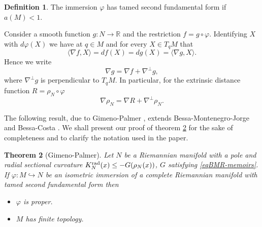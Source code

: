 \documentclass[a4paper]{amsart}
\newtheorem{theorem}{Theorem}[section]
\theoremstyle{definition}
\newtheorem{definition}[theorem]{Definition}
\numberwithin{equation}{section}
\providecommand{\rad}{\mathop{\rm rad}\nolimits}
\begin{document}
\begin{definition}
The immersion $\varphi$ has tamed second fundamental
form if $a(M)< 1$.
\end{definition}

Consider a smooth function $g:N\to {\mathbb{R}}$ and the restriction $f=g\circ \varphi$. Identifying $X$ with $d\varphi(X)$ we have at $q\in M$ and for every $X\in T_qM$ that
\begin{equation}
\langle \nabla f,X\rangle=df(X)=dg(X)=\langle \nabla g,X\rangle.
\end{equation}
Hence we write
\begin{equation}
\nabla g=\nabla f+\nabla^{\perp}g,
\end{equation}
where $\nabla^{\perp}g$ is perpendicular to $T_qM$. In particular, for the extrinsic distance function $R=\rho_N\circ \varphi$
\begin{equation}
\nabla \rho_N=\nabla R+\nabla^\perp \rho_N.
\end{equation}

The following result, due to Gimeno-Palmer \cite{GPGap}, extends Bessa-Montenegro-Jorge \cite{Pac} and Bessa-Costa \cite{Pac2}. We shall present our proof of theorem \ref{logan} for the sake of completeness and to clarify the notation used in the paper.

\begin{theorem}[Gimeno-Palmer]\label{logan}Let $N$ be a Riemannian manifold with a pole  and radial sectional curvature $K_{N}^{\rad}(x)\leq -G(\rho_{N}(x))$, $G$ satisfying \eqref{eqBMR-memoirs}. If $\varphi\colon M \hookrightarrow N$ be an isometric immersion    of a complete Riemannian manifold with tamed second fundamental form then\begin{itemize}\item[i.] $\varphi$ is proper.\item[ii.] $M$ has finite topology.\end{itemize}
\end{theorem}
\end{document}

